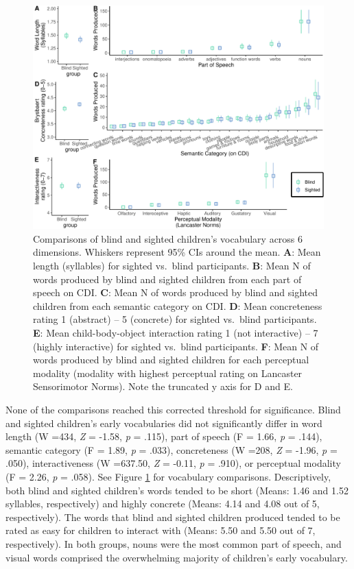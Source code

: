 \documentclass[
  man,floatsintext]{apa6}
\begin{document}
\begin{figure}
\centering
\includegraphics{VI_CDI_manuscript_files/figure-latex/vocab-comparison-1.pdf}
\caption{\label{fig:vocab-comparison}Comparisons of blind and sighted children's vocabulary across 6 dimensions. Whiskers represent 95\% CIs around the mean. \textbf{A}: Mean length (syllables) for sighted vs.~blind participants. \textbf{B}: Mean N of words produced by blind and sighted children from each part of speech on CDI. \textbf{C}: Mean N of words produced by blind and sighted children from each semantic category on CDI. \textbf{D}: Mean concreteness rating 1 (abstract) -- 5 (concrete) for sighted vs.~blind participants. \textbf{E}: Mean child-body-object interaction rating 1 (not interactive) -- 7 (highly interactive) for sighted vs.~blind participants. \textbf{F}: Mean N of words produced by blind and sighted children for each perceptual modality (modality with highest perceptual rating on Lancaster Sensorimotor Norms). Note the truncated y axis for D and E.}
\end{figure}

None of the comparisons reached this corrected threshold for significance. Blind and sighted children's early vocabularies did not significantly differ in word length (W =434, \emph{Z} = -1.58, \emph{p} = .115), part of speech (F = 1.66, \emph{p} = .144), semantic category (F = 1.89, \emph{p} = .033), concreteness (W =208, \emph{Z} = -1.96, \emph{p} = .050), interactiveness (W =637.50, \emph{Z} = -0.11, \emph{p} = .910), or perceptual modality (F = 2.26, \emph{p} = .058). See Figure \ref{fig:vocab-comparison} for vocabulary comparisons. Descriptively, both blind and sighted children's words tended to be short (Means: 1.46 and 1.52 syllables, respectively) and highly concrete (Means: 4.14 and 4.08 out of 5, respectively). The words that blind and sighted children produced tended to be rated as easy for children to interact with (Means: 5.50 and 5.50 out of 7, respectively). In both groups, nouns were the most common part of speech, and visual words comprised the overwhelming majority of children's early vocabulary.
\end{document}
